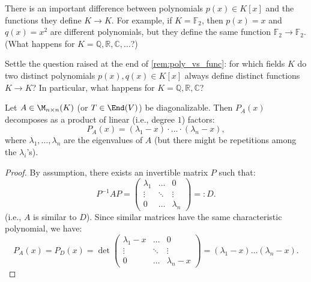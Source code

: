 \begin{importantremark}\label{rem:poly_vs_func}
  There is an important difference between polynomials $p(x) \in K[x]$ and the functions they define $K \rightarrow K$.
  For example, if $K = \mathbb{F}_2$, then $p(x) = x$ and $q(x) = x^2$ are different polynomials, but they define the same function $\mathbb{F}_2 \rightarrow \mathbb{F}_2$. (What happens for $K = \mathbb{Q}, \mathbb{R}, \mathbb{C}, \dots$?)
\end{importantremark}

\begin{exercise}\label{ex:poly_vs_func}
  Settle the question raised at the end of \cref{rem:poly_vs_func}: for which fields $K$ do two distinct polynomials $p(x), q(x) \in K[x]$ always define distinct functions $K \to K$? In particular, what happens for $K = \mathbb{Q}, \mathbb{R}, \mathbb{C}$?
\end{exercise}

\begin{lemma}
  \label{lem:diag_decomp}
  Let $A \in \M_{n \times n}(K)$ (or $T \in \End(V)$) be diagonalizable. Then $P_A(x)$ decomposes as a product of linear (i.e., degree $1$) factors:
  \[ P_A(x) = (\lambda_1 - x) \cdot \dots \cdot (\lambda_n - x), \]
  where $\lambda_1, \dots, \lambda_n$ are the eigenvalues of $A$ (but there might be repetitions among the $\lambda_i$'s).
\end{lemma}

\begin{proof}
  By assumption, there exists an invertible matrix $P$ such that:
  \begin{equation} \label{eq:diagonal_similarity}
    P^{-1}AP = \begin{pmatrix} \lambda_1 & \dots & 0 \\ \vdots & \ddots & \vdots \\ 0 & \dots & \lambda_n \end{pmatrix} =: D.
  \end{equation}
  (i.e., $A$ is similar to $D$).
  Since similar matrices have the same characteristic polynomial, we have:
  \[ P_A(x) = P_D(x) = \det \begin{pmatrix} \lambda_1 - x & \dots & 0 \\ \vdots & \ddots & \vdots \\ 0 & \dots & \lambda_n - x \end{pmatrix} = (\lambda_1 - x) \dots (\lambda_n - x). \]
\end{proof}

